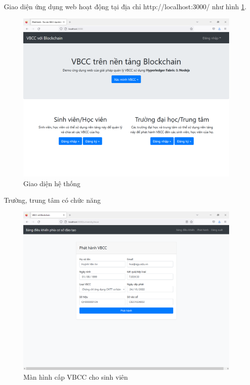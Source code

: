 Giao diện ứng dụng web hoạt động tại địa chỉ http://localhost:3000/ như hình \ref{fig:main_vbcc}. 

\begin{figure}[H]
\centering
\includegraphics[width=.9\linewidth]{img/main_vbcc.png}
\caption{Giao diện hệ thống}
\label{fig:main_vbcc}
\end{figure}

Trường, trung tâm có chức năng

\begin{figure}[H]
\centering
\includegraphics[width=.9\linewidth]{img/tt_phathanh.PNG}
\caption{Màn hình cấp VBCC cho sinh viên}
\label{fig:tt_phathanh}
\end{figure}

